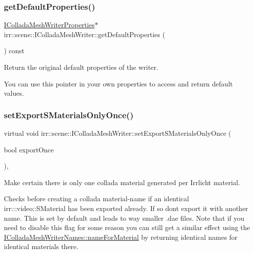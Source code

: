 \subsubsection{\texorpdfstring{get\+Default\+Properties()}{getDefaultProperties()}}
{\footnotesize\ttfamily \hyperlink{classirr_1_1scene_1_1IColladaMeshWriterProperties}{I\+Collada\+Mesh\+Writer\+Properties}$\ast$ irr\+::scene\+::\+I\+Collada\+Mesh\+Writer\+::get\+Default\+Properties (\begin{DoxyParamCaption}{ }\end{DoxyParamCaption}) const\hspace{0.3cm}{\ttfamily [inline]}}



Return the original default properties of the writer. 

You can use this pointer in your own properties to access and return default values. \mbox{\label{classirr_1_1scene_1_1IColladaMeshWriter_af6f37ca4a1ef6238cc079f3f5d5eb612}} 
\subsubsection{\texorpdfstring{set\+Export\+S\+Materials\+Only\+Once()}{setExportSMaterialsOnlyOnce()}}
{\footnotesize\ttfamily virtual void irr\+::scene\+::\+I\+Collada\+Mesh\+Writer\+::set\+Export\+S\+Materials\+Only\+Once (\begin{DoxyParamCaption}\item[{bool}]{export\+Once }\end{DoxyParamCaption})\hspace{0.3cm}{\ttfamily [inline]}, {\ttfamily [virtual]}}



Make certain there is only one collada material generated per Irrlicht material. 

Checks before creating a collada material-\/name if an identical irr\+:\+::video\+::\+S\+Material has been exported already. If so don\textquotesingle{}t export it with another name. This is set by default and leads to way smaller .dae files. Note that if you need to disable this flag for some reason you can still get a similar effect using the \hyperlink{classirr_1_1scene_1_1IColladaMeshWriterNames_acb5c8f38769d3fedcc76df73d9350c07}{I\+Collada\+Mesh\+Writer\+Names\+::name\+For\+Material} by returning identical names for identical materials there. \mbox{\label{classirr_1_1scene_1_1IColladaMeshWriter_a25d2e1ff0bf04375c822800b0b3a4b01}} 

